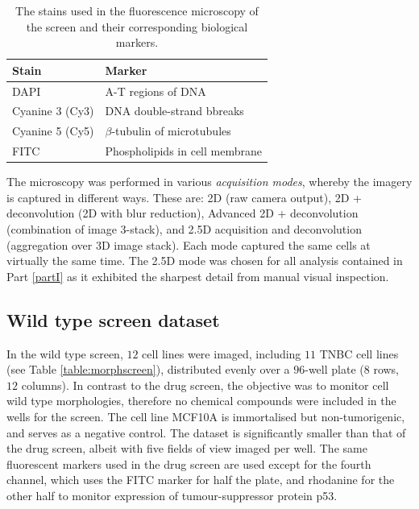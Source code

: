 \begin{table}
\begin{center}
\begin{tabular}{|l|l|}
\hline
Stain & Marker \\
\hline
DAPI &  A-T regions of DNA\\
\hline
Cyanine 3 (Cy3) &DNA double-strand bbreaks\\
\hline
Cyanine 5 (Cy5) & $\beta$-tubulin of microtubules\\
\hline
FITC & Phospholipids in cell membrane\\
\hline
\end{tabular}
\caption{The stains used in the fluorescence microscopy of the screen and their corresponding biological markers.}
\label{table:stains}
\end{center}
\end{table}

The microscopy was performed in various \emph{acquisition modes}, whereby the imagery is captured in different ways. These are: 2D (raw camera output), 2D + deconvolution (2D with blur reduction), Advanced 2D + deconvolution (combination of image 3-stack), and 2.5D acquisition and deconvolution (aggregation over 3D image stack). Each mode captured the same cells at virtually the same time. The 2.5D mode was chosen for all analysis contained in Part \ref{partI} as it exhibited the sharpest detail from manual visual inspection.


\subsection{Wild type screen dataset}
\label{subsec:morphogical}

In the wild type screen, $12$ cell lines were imaged, including $11$ TNBC cell lines (see Table \ref{table:morphscreen}), distributed evenly over a $96$-well plate ($8$ rows, $12$ columns). In contrast to the drug screen, the objective was to monitor cell wild type morphologies, therefore no chemical compounds were included in the wells for the screen. The cell line MCF10A is immortalised but non-tumorigenic, and serves as a negative control. The dataset is significantly smaller than that of the drug screen, albeit with five fields of view imaged per well. The same fluorescent markers used in the drug screen are used except for the fourth channel, which uses the FITC marker for half the plate, and rhodanine for the other half to monitor expression of tumour-suppressor protein p53.


